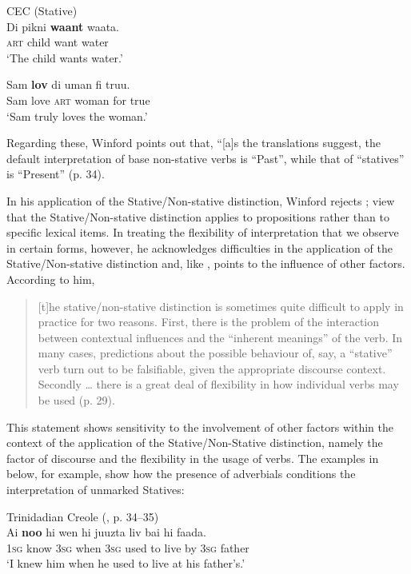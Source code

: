 \ea%
\label{ex:2:16}
CEC (Stative)\\
\ea
\gll Di pikni \textbf{waant} waata.\\
\textsc{art} child want water\\
\glt `The child wants water.'

\ex
\gll Sam \textbf{lov} di uman fi truu.\\
		Sam love \textsc{art} woman for true\\
\glt `Sam truly loves the woman.'  \z \z

Regarding these, Winford points out that, “[a]s the translations
suggest, the default interpretation of base non-stative verbs is
“Past”, while that of “statives” is “Present” (p. 34).

In his application of the Stative\slash Non-stative distinction, Winford
rejects ; view that the Stative\slash Non-stative
distinction applies to propositions rather than to specific lexical
items.  In treating the flexibility of interpretation that we observe
in certain forms, however, he acknowledges difficulties in the
application of the Stative\slash Non-stative distinction and, like
\citet{Jaganauth1987}, points to the influence of other factors.
According to him,

\begin{quote}
[t]he stative\slash non-stative distinction is sometimes quite difficult to
apply in practice for two reasons.  First, there is the problem of the
interaction between contextual influences and the “inherent meanings”
of the verb. In many cases, predictions about the possible behaviour
of, say, a “stative” verb turn out to be falsifiable, given the
appropriate discourse context.  Secondly … there is a great deal of
flexibility in how individual verbs may be used (p. 29).
\end{quote}

This statement shows sensitivity to the involvement of other factors
within the context of the application of the Stative\slash Non-Stative
distinction, namely the factor of discourse and the flexibility in the
usage of verbs.  The examples in  below, for example, show
how the presence of adverbials conditions the interpretation of
unmarked Statives:

\ea%
\label{ex:2:17}
{Trinidadian Creole (\citealt{Winford1993}, p. 34--35)}\\
\ea
\gll Ai \textbf{noo} hi     wen    hi     juuzta    liv   bai   hi   faada.\\
        \textsc{1sg} know  \textsc{3sg}  when \textsc{3sg} used to   live by   \textsc{3sg} father \\
\glt `I knew him when he used to live at his father’s.'


